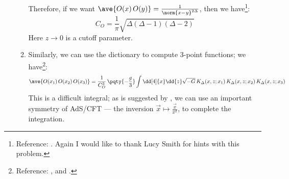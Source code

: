 \documentclass[a4paper,10pt]{article}
\begin{document}
\begin{enumerate}
\begin{enumerate}
	Therefore, if we want $
		\ave{O(x)\,O(y)}
		= \frac{1}{\norm{x - y}^{2\Delta}}
	$, then we have\footnote{
		Reference: . Again I would like to thank Lucy Smith for hints with this problem. 
	}:
	\begin{equation}
		C_O
		= \frac{1}{\pi} \sqrt{
				\Delta(\Delta - 1)(\Delta - 2)
			}
	\end{equation}
	Here $z\to 0$ is a cutoff parameter. 
	
	\item Similarly, we can use the dictionary to compute 3-point functions; we have\footnote{
		Reference: , and . 
	}:
	\begin{equation}
		\ave{O(x_1)\,O(x_2)\,O(x_3)}
		= \frac{1}{C_O^3}\,
			\pqty{-\frac{g}{3}}
			\int \dd[4]{x} \dd{z} \sqrt{-G}\,
				K_\Delta(x,z;x_1)\,
				K_\Delta(x,z;x_2)\,
				K_\Delta(x,z;x_3)
	\end{equation}
	This is a difficult integral; as is suggested by , we can use an important symmetry of AdS/CFT --- the inversion $
		\vec{x}\mapsto \frac{\vec{x}}{x^2}
	$, to complete the integration. 
	

\end{enumerate}
\end{enumerate}
\end{document}
